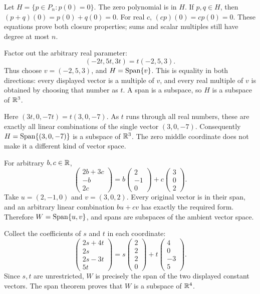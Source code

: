 Let $H=\{p\in P_n:p(0)=0\}$. The zero polynomial is in $H$.
If $p,q\in H$, then $(p+q)(0)=p(0)+q(0)=0$.
For real $c$, $(cp)(0)=cp(0)=0$. These equations prove both closure properties;
sums and scalar multiples still have degree at most $n$.

Factor out the arbitrary real parameter:
\[
 (-2t,5t,3t)=t(-2,5,3).
\]
Thus choose $v=(-2,5,3)$, and $H=\operatorname{Span}\{v\}$. This is equality in both
directions: every displayed vector is a multiple of $v$, and every real
multiple of $v$ is obtained by choosing that number as $t$.
A span is a subspace, so $H$ is a subspace of $\mathbb{R}^3$.

Here $(3t,0,-7t)=t(3,0,-7)$. As $t$ runs through all real numbers, these are
exactly all linear combinations of the single vector $(3,0,-7)$.
Consequently $H=\operatorname{Span}\{(3,0,-7)\}$ is a subspace of $\mathbb{R}^3$.
The zero middle coordinate does not make it a different kind of vector space.

For arbitrary $b,c\in\mathbb{R}$,
\[
 \begin{pmatrix}2b+3c\\-b\\2c\end{pmatrix}
 =b\begin{pmatrix}2\\-1\\0\end{pmatrix}
 +c\begin{pmatrix}3\\0\\2\end{pmatrix}.
\]
Take $u=(2,-1,0)$ and $v=(3,0,2)$. Every original vector is in their span,
and an arbitrary linear combination $bu+cv$ has exactly the required form.
Therefore $W=\operatorname{Span}\{u,v\}$, and spans are subspaces of the ambient vector space.

Collect the coefficients of $s$ and $t$ in each coordinate:
\[
 \begin{pmatrix}2s+4t\\2s\\2s-3t\\5t\end{pmatrix}
 =s\begin{pmatrix}2\\2\\2\\0\end{pmatrix}
 +t\begin{pmatrix}4\\0\\-3\\5\end{pmatrix}.
\]
Since $s,t$ are unrestricted, $W$ is precisely the span of the two displayed
constant vectors. The span theorem proves that $W$ is a subspace of $\mathbb{R}^4$.

